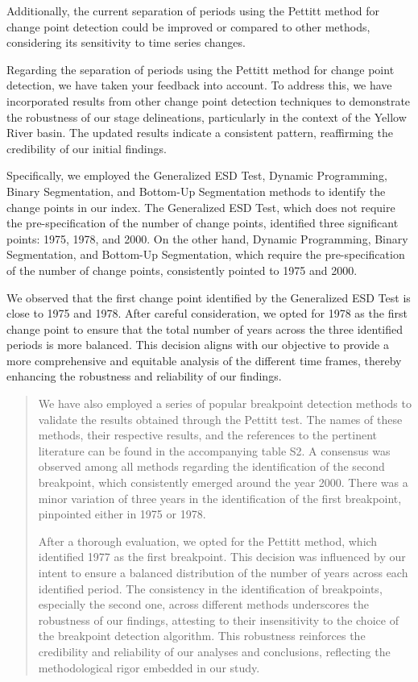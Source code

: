 \RC{} Additionally, the current separation of periods using the Pettitt method for change point detection could be improved or compared to other methods, considering its sensitivity to time series changes.

\AR{} Regarding the separation of periods using the Pettitt method for change point detection, we have taken your feedback into account. To address this, we have incorporated results from other change point detection techniques to demonstrate the robustness of our stage delineations, particularly in the context of the Yellow River basin. The updated results indicate a consistent pattern, reaffirming the credibility of our initial findings.

Specifically, we employed the Generalized ESD Test, Dynamic Programming, Binary Segmentation, and Bottom-Up Segmentation methods to identify the change points in our index. The Generalized ESD Test, which does not require the pre-specification of the number of change points, identified three significant points: 1975, 1978, and 2000. On the other hand, Dynamic Programming, Binary Segmentation, and Bottom-Up Segmentation, which require the pre-specification of the number of change points, consistently pointed to 1975 and 2000.

We observed that the first change point identified by the Generalized ESD Test is close to 1975 and 1978. After careful consideration, we opted for 1978 as the first change point to ensure that the total number of years across the three identified periods is more balanced. This decision aligns with our objective to provide a more comprehensive and equitable analysis of the different time frames, thereby enhancing the robustness and reliability of our findings.

\begin{quote}
	We have also employed a series of popular breakpoint detection methods to validate the results obtained through the Pettitt test. The names of these methods, their respective results, and the references to the pertinent literature can be found in the accompanying table S2. A consensus was observed among all methods regarding the identification of the second breakpoint, which consistently emerged around the year 2000. There was a minor variation of three years in the identification of the first breakpoint, pinpointed either in 1975 or 1978.

	After a thorough evaluation, we opted for the Pettitt method, which identified 1977 as the first breakpoint. This decision was influenced by our intent to ensure a balanced distribution of the number of years across each identified period. The consistency in the identification of breakpoints, especially the second one, across different methods underscores the robustness of our findings, attesting to their insensitivity to the choice of the breakpoint detection algorithm. This robustness reinforces the credibility and reliability of our analyses and conclusions, reflecting the methodological rigor embedded in our study.
\end{quote}

